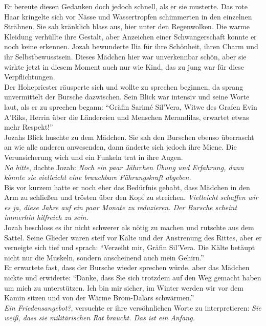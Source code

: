 Er bereute diesen Gedanken doch jedoch schnell, als er sie musterte. Das rote Haar kringelte sich 
vor Nässe und Wassertropfen schimmerten in den einzelnen Strähnen. Sie sah kränklich blass aus, 
hier unter den Regenwolken. Die warme Kleidung verhüllte ihre Gestalt, aber Anzeichen einer 
Schwangerschaft konnte er noch keine erkennen. Jozah bewunderte Ilia für ihre Schönheit, ihren 
Charm und ihr Selbstbewusstsein. Dieses Mädchen hier war unverkennbar schön, aber sie wirkte jetzt 
in diesem Moment auch nur wie Kind, das zu jung war für diese Verpflichtungen.\\
Der Hohepriester räusperte sich und wollte zu sprechen beginnen, da sprang unvermittelt der Bursche 
dazwischen. Sein Blick war intensiv und seine Worte laut, als er zu sprechen begann: ``Gräfin 
Sarimé Sil'Vera, Witwe des Grafen Evin A'Riks, Herrin über die Ländereien und Menschen Merandilas, 
erwartet etwas mehr Respekt!''\\
Jozahs Blick huschte zu dem Mädchen. Sie sah den Burschen ebenso überrascht an wie alle anderen 
anwesenden, dann änderte sich jedoch ihre Miene. Die Verunsicherung wich und ein Funkeln trat in 
ihre Augen.\\
\textit{Na bitte}, dachte Jozah: \textit{Noch ein paar Jährchen Übung und Erfahrung, dann könnte 
sie vielleicht eine brauchbare Führungskraft abgeben.}\\
Bis vor kurzem hatte er noch eher das Bedürfnis gehabt, dass Mädchen in den Arm zu schließen und 
trösten über den Kopf zu streichen. \textit{Vielleicht schaffen wir es ja, diese Jahre auf ein paar 
Monate zu reduzieren. Der Bursche scheint immerhin hilfreich zu sein.}\\
Jozah beschloss es ihr nicht schwerer als nötig zu machen und rutschte aus dem Sattel. Seine 
Glieder waren steif vor Kälte und der Anstrenung des Rittes, aber er verneigte sich tief und 
sprach: ``Verzeiht mir, Gräfin Sil'Vera. Die Kälte betäupt nicht nur die Muskeln, sondern 
anscheinend auch mein Gehirn.''\\
Er erwartete fast, dass der Bursche wieder sprechen würde, aber das Mädchen nickte und erwiderte: 
``Danke, dass Sie sich trotzdem auf den Weg gemacht haben um mich zu unterstützen. Ich bin mir 
sicher, im Winter werden wir vor dem Kamin sitzen und von der Wärme Brom-Dalars schwärmen.''\\
\textit{Ein Friedensangebot?}, versuchte er ihre versöhnlichen Worte zu interpretieren: \textit{Sie 
weiß, dass sie militärischen Rat braucht. Das ist ein Anfang.}\\

